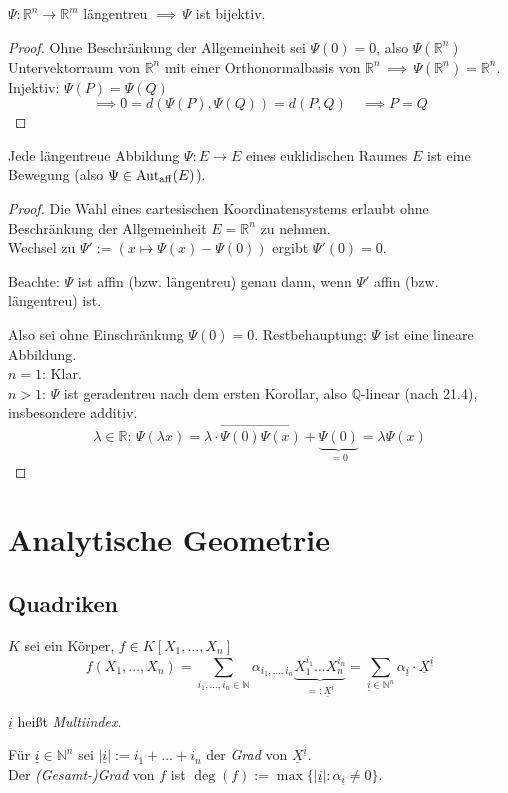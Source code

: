 \documentclass[parskip,a4paper,twoside,DIV15,BCOR12mm]{scrbook}
\begin{document}
\begin{corollary}
\(\Psi:\mathbb{R}^{n}\to\mathbb{R}^{m}\) l\"angentreu \(\implies\,\Psi\) ist 
bijektiv.
\end{corollary}
\begin{proof}
Ohne Beschr\"ankung der Allgemeinheit sei \(\Psi(0)=0\), also 
\(\Psi(\mathbb{R}^{n})\) Untervektorraum von \(\mathbb{R}^{n}\) mit einer 
Orthonormalbasis von \(\mathbb{R}^{n}\,\implies\,\Psi(\mathbb{R}^{n})=\mathbb{R}^{n}\).\\
Injektiv: \(\Psi(P)=\Psi(Q)\)
\[
\implies 0=d(\Psi(P),\Psi(Q))=d(P,Q)\quad\implies P=Q
\]
\end{proof}

\begin{theo}
Jede l\"angentreue Abbildung \(\Psi:E\to E\) eines euklidischen Raumes \(E\) ist
eine Bewegung (also \(\Psi\in\operatorname{Aut_{aff}}(E)\)).
\end{theo}
\begin{proof}
Die Wahl eines cartesischen Koordinatensystems erlaubt ohne Beschr\"ankung der
Allgemeinheit \(E=\mathbb{R}^{n}\) zu nehmen.\\
Wechsel zu \(\Psi':=(x\mapsto\Psi(x)-\Psi(0))\) ergibt \(\Psi'(0)=0\).

Beachte: \(\Psi\) ist affin (bzw. l\"angentreu) genau dann, wenn \(\Psi'\) affin
(bzw. l\"angentreu) ist.

Also sei ohne Einschr\"ankung \(\Psi(0)=0\). Restbehauptung: \(\Psi\) ist eine
lineare Abbildung.\\
\(n=1\): Klar.\\
\(n>1\): \(\Psi\) ist geradentreu nach dem ersten Korollar, also 
\(\mathbb{Q}\)-linear (nach 21.4), insbesondere additiv. 
\[
\lambda\in\mathbb{R}:\,\Psi(\lambda x)=\lambda\cdot\overrightarrow{\Psi(0)\Psi(x)}+\underbrace{\Psi(0)}_{=0}=\lambda\Psi(x)
\]
\end{proof}

\chapter{Analytische Geometrie}
\section{Quadriken}

\(K\) sei ein K\"orper, \(f\in K[X_{1},\ldots,X_{n}]\)
\[
f(X_{1},\ldots,X_{n})=\sum_{i_{1},\ldots,i_{n}\in\mathbb{N}}{\alpha_{i_{1},\ldots,i_{n}}\underbrace{X_{1}^{i_{1}}\ldots X_{n}^{i_{n}}}_{=:\underline{X}^{\underline{i}}}}=
\sum_{\underline{i}\in\mathbb{N}^{n}}{\alpha_{\underline{i}}\cdot\underline{X}^{\underline{i}}}
\]

\(\underline{i}\) hei\ss t \emph{Multiindex}.
\begin{definition}
F\"ur \(\underline{i}\in\mathbb{N}^{n}\) sei \(|\underline{i}|:=i_{1}+\ldots+i_{n}\) der \emph{Grad} von \(\underline{X}^{\underline{i}}\).\\
Der \emph{(Gesamt-)Grad} von \(f\) ist \(\deg(f):=\max\{|\underline{i}|:\alpha_{\underline{i}}\neq0\}\).
\end{definition}

\renewcommand{\indexname}{Stichwortverzeichnis}
\printindex
\end{document}

